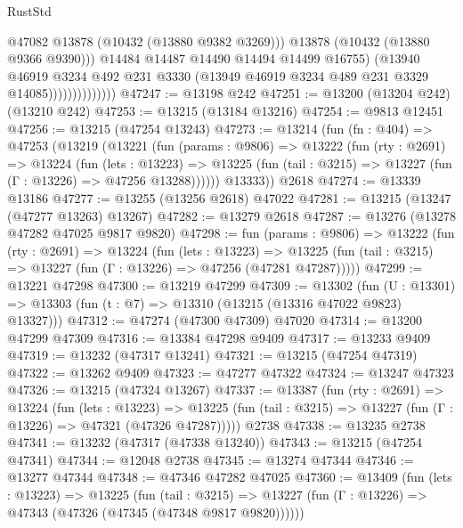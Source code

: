 \begin{lexlean}{RustStd}
\begin{coremodule}
                                  @47082
                                  @13878
                                  (@10432 (@13880 @9382 @3269)))
                                @13878
                                (@10432 (@13880 @9366 @9390)))
                              @14484
                              @14487
                              @14490
                              @14494
                              @14499
                              @16755)
                            (@13940
                              @46919
                              @3234
                              @492
                              @231
                              @3330
                              (@13949 @46919 @3234 @489 @231 @3329 @14085))))))))))))))
@47247 := @13198 @242
@47251 := @13200 (@13204 @242) (@13210 @242)
@47253 := @13215 (@13184 @13216)
@47254 := @9813 @12451
@47256 := @13215 (@47254 @13243)
@47273 := @13214
    (fun (fn : @404) =>
    @47253
      (@13219
        (@13221
          (fun (params : @9806) =>
          @13222
            (fun (rty : @2691) =>
            @13224
              (fun (lets : @13223) =>
              @13225 (fun (tail : @3215) => @13227 (fun (Γ : @13226) => @47256 @13288))))))
        @13333))
    @2618
@47274 := @13339 @13186
@47277 := @13255 (@13256 @2618) @47022
@47281 := @13215 (@13247 (@47277 @13263) @13267)
@47282 := @13279 @2618
@47287 := @13276 (@13278 @47282 @47025 @9817 @9820)
@47298 := fun (params : @9806) =>
  @13222
    (fun (rty : @2691) =>
    @13224
      (fun (lets : @13223) =>
      @13225 (fun (tail : @3215) => @13227 (fun (Γ : @13226) => @47256 (@47281 @47287)))))
@47299 := @13221 @47298
@47300 := @13219 @47299
@47309 := @13302
    (fun (U : @13301) => @13303 (fun (t : @7) => @13310 (@13215 (@13316 @47022 @9823) @13327)))
@47312 := @47274 (@47300 @47309) @47020
@47314 := @13200 @47299 @47309
@47316 := @13384 @47298 @9409
@47317 := @13233 @9409
@47319 := @13232 (@47317 @13241)
@47321 := @13215 (@47254 @47319)
@47322 := @13262 @9409
@47323 := @47277 @47322
@47324 := @13247 @47323
@47326 := @13215 (@47324 @13267)
@47337 := @13387
    (fun (rty : @2691) =>
    @13224
      (fun (lets : @13223) =>
      @13225 (fun (tail : @3215) => @13227 (fun (Γ : @13226) => @47321 (@47326 @47287)))))
    @2738
@47338 := @13235 @2738
@47341 := @13232 (@47317 (@47338 @13240))
@47343 := @13215 (@47254 @47341)
@47344 := @12048 @2738
@47345 := @13274 @47344
@47346 := @13277 @47344
@47348 := @47346 @47282 @47025
@47360 := @13409
    (fun (lets : @13223) =>
    @13225
      (fun (tail : @3215) =>
      @13227 (fun (Γ : @13226) => @47343 (@47326 (@47345 (@47348 @9817 @9820))))))

\end{coremodule}
\end{lexlean}
